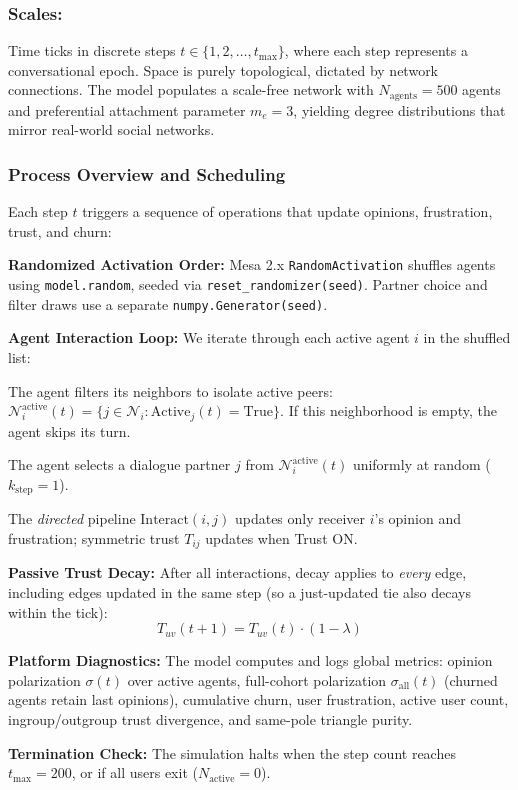 \subsubsection{Scales:} Time ticks in discrete steps $t \in \{1, 2, \dots, t_{\max}\}$, where each step represents a conversational epoch. Space is purely topological, dictated by network connections. The model populates a scale-free network with $N_{\text{agents}} = 500$ agents and preferential attachment parameter $m_e = 3$, yielding degree distributions that mirror real-world social networks.

\subsubsection{Process Overview and Scheduling}
Each step $t$ triggers a sequence of operations that update opinions, frustration, trust, and churn:
\begin{enumerate*}
    \item \textbf{Randomized Activation Order:} Mesa 2.x \texttt{RandomActivation} shuffles agents using \texttt{model.random}, seeded via \texttt{reset\_randomizer(seed)}. Partner choice and filter draws use a separate \texttt{numpy.Generator(seed)}.
    \item \textbf{Agent Interaction Loop:} We iterate through each active agent $i$ in the shuffled list:
    \begin{enumerate*}
        \item The agent filters its neighbors to isolate active peers: $\mathcal{N}_i^{\text{active}}(t) = \{j \in \mathcal{N}_i : \text{Active}_j(t) = \text{True}\}$. If this neighborhood is empty, the agent skips its turn.
        \item The agent selects a dialogue partner $j$ from $\mathcal{N}_i^{\text{active}}(t)$ uniformly at random ($k_{\text{step}} = 1$).
        \item The \emph{directed} pipeline $\text{Interact}(i, j)$ updates only receiver $i$'s opinion and frustration; symmetric trust $T_{ij}$ updates when Trust ON.
    \end{enumerate*}
    \item \textbf{Passive Trust Decay:} After all interactions, decay applies to \emph{every} edge, including edges updated in the same step (so a just-updated tie also decays within the tick):
    \begin{equation}
        T_{uv}(t+1) = T_{uv}(t) \cdot (1 - \lambda)
    \end{equation}
    \item \textbf{Platform Diagnostics:} The model computes and logs global metrics: opinion polarization $\sigma(t)$ over active agents, full-cohort polarization $\sigma_{\mathrm{all}}(t)$ (churned agents retain last opinions), cumulative churn, user frustration, active user count, ingroup/outgroup trust divergence, and same-pole triangle purity.
    \item \textbf{Termination Check:} The simulation halts when the step count reaches $t_{\max} = 200$, or if all users exit ($N_{\text{active}} = 0$).
\end{enumerate*}

